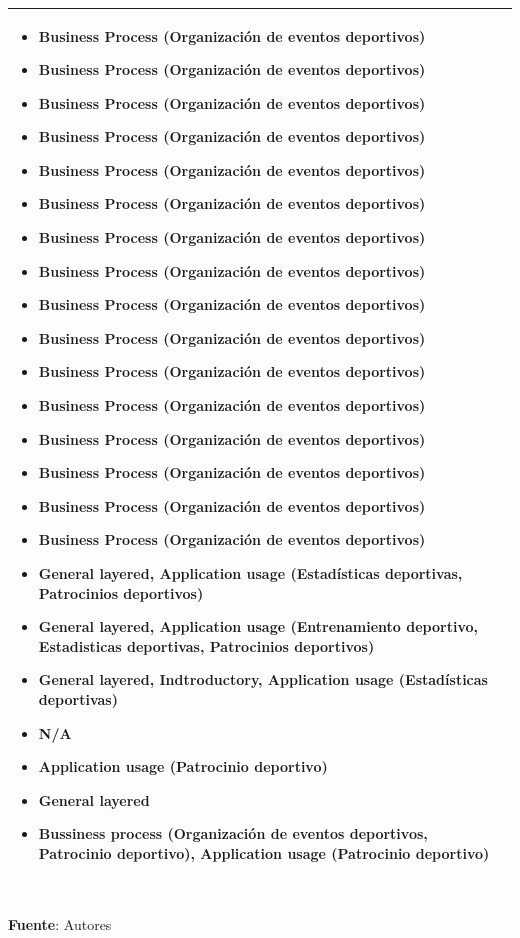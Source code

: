\begin{table}[!htb]
\begin{center}
{\begin{tabular}{|p{7cm}|p{4cm}|}
\begin{itemize}
				\item Business Process (Organización de eventos deportivos)
				\item Business Process (Organización de eventos deportivos)
				\item Business Process (Organización de eventos deportivos) 
				\item Business Process (Organización de eventos deportivos)
				\item Business Process (Organización de eventos deportivos)
				\item Business Process (Organización de eventos deportivos) 
				\item Business Process (Organización de eventos deportivos)
				\item Business Process (Organización de eventos deportivos)
				\item Business Process (Organización de eventos deportivos) 
				\item Business Process (Organización de eventos deportivos)
				\item Business Process (Organización de eventos deportivos)
				\item Business Process (Organización de eventos deportivos) 
				\item Business Process (Organización de eventos deportivos)
				\item Business Process (Organización de eventos deportivos)
				\item Business Process (Organización de eventos deportivos) 
				\item Business Process (Organización de eventos deportivos)
				\item General layered, Application usage (Estadísticas deportivas, Patrocinios deportivos)
				\item General layered, Application usage (Entrenamiento deportivo, Estadisticas deportivas, Patrocinios deportivos)
				\item General layered, Indtroductory, Application usage (Estadísticas deportivas)
				\item N/A
				\item Application usage (Patrocinio deportivo) 
				\item General layered
				\item Bussiness process (Organización de eventos deportivos, Patrocinio deportivo), Application usage (Patrocinio deportivo)
			\end{itemize} 
			\\
			\hline
		\end{tabular}
		} \\
		\textbf{Fuente}: Autores
	\end{center}
\end{table}


